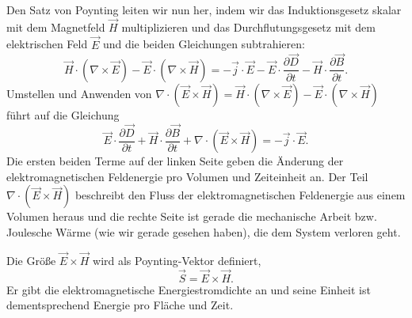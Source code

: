 Den Satz von Poynting leiten wir nun her, indem wir das Induktionsgesetz skalar mit dem Magnetfeld $\vec {H}$ multiplizieren und das Durchflutungsgesetz mit dem elektrischen Feld $\vec {E}$ und die beiden Gleichungen subtrahieren:
\begin{equation*}
	\vec {H}\cdot \left(\nabla \times \vec {E}\right)-\vec {E}\cdot \left(\nabla \times \vec {H}\right)=-\vec {j}\cdot \vec {E}-\vec {E}\cdot \frac{\partial \vec {D}}{\partial t}-\vec {H}\cdot \frac{\partial \vec {B}}{\partial t}.
\end{equation*}
Umstellen und Anwenden von $\nabla \cdot \left(\vec {E}\times \vec {H}\right)=\vec {H}\cdot \left(\nabla \times \vec {E}\right)-\vec {E}\cdot \left(\nabla \times \vec {H}\right)$ führt auf die Gleichung
\begin{equation}
	\label{eq:satz_von_poynting}
	\boxed{\vec {E}\cdot \frac{\partial \vec {D}}{\partial t}+\vec {H}\cdot \frac{\partial \vec {B}}{\partial t}+\nabla \cdot \left(\vec {E}\times \vec {H}\right)=-\vec {j}\cdot \vec {E}.}
\end{equation}
Die ersten beiden Terme auf der linken Seite geben die Änderung der elektromagnetischen Feldenergie pro Volumen und Zeiteinheit an. Der Teil $\nabla \cdot \left(\vec {E}\times \vec {H}\right)$ beschreibt den Fluss der elektromagnetischen Feldenergie aus einem Volumen heraus und die rechte Seite ist gerade die mechanische Arbeit bzw. Joulesche Wärme (wie wir gerade gesehen haben), die dem System verloren geht.

Die Größe $\vec {E}\times \vec {H}$ wird als Poynting-Vektor definiert,
\begin{equation*}
	\vec {S}=\vec {E}\times \vec {H}.
\end{equation*}
Er gibt die elektromagnetische Energiestromdichte an und seine Einheit ist dementsprechend Energie pro Fläche und Zeit.

